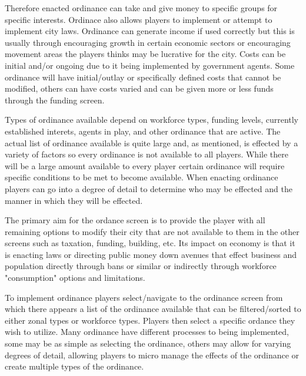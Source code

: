 Therefore enacted ordinance can take and give money to specific groups for specific interests. Ordinace also allows players to implement or attempt to implement city laws. Ordinance can generate income if used correctly but this is usually through encouraging growth in certain economic sectors or encouraging movement areas the players thinks may be lucrative for the city. Costs can be initial and/or ongoing due to it being implemented by government agents. Some ordinance will have initial/outlay or specifically defined costs that cannot be modified, others can have costs varied and can be given more or less funds through the funding screen. 


Types of ordinance available depend on workforce types, funding levels, currently established interets, agents in play, and other ordinance that are active. The actual list of ordinance available is quite large and, as mentioned, is effected by a variety of factors so every ordinance is not available to all players. While there will be a large amount available to every player certain ordinance will require specific conditions to be met to become available. When enacting ordinance players can go into a degree of detail to determine who may be effected and the manner in which they will be effected. 




The primary aim for the ordance screen is to provide the player with all remaining options to modify their city that are not available to them in the other screens such as taxation, funding, building, etc. Its impact on economy is that it is enacting laws or directing public money down avenues that effect business and population directly through bans or similar or indirectly through workforce "consumption" options and limitations.

To implement ordinance players select/navigate to the ordinance screen from which there appears a list of the ordinance available that can be filtered/sorted to either zonal types or workforce types. Players then select a specific ordance they wish to utilize. Many ordinance have different processes to being implemented, some may be as simple as selecting the ordinance, others may allow for varying degrees of detail, allowing players to micro manage the effects of the ordinance or create multiple types of the ordinance. 

